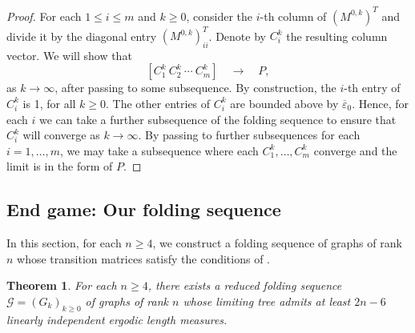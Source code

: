 \documentclass[11pt, letterpaper]{amsart}
\theoremstyle{plain}
\newtheorem{theorem}{Theorem}[section]
\theoremstyle{definition}
\newcommand{\calG}{\mathcal{G}}
\renewcommand{\epsilon}{\varepsilon}
\newcommand{\eps}{\epsilon}
\newcommand{\ov}[1]{\overline{#1}}
\begin{document}
\begin{proof}
    For each $1 \le i \le m$ and $k \ge 0$, consider the $i$-th column of
    $(M^{0,k})^T$ and divide it by the diagonal entry $(M^{0,k})^T_{ii}$. Denote
    by $C_i^k$ the resulting column vector. We will show that
    \[
        \left[ C_1^k\ C_2^k\ \cdots \ C_m^k \right] \quad \longrightarrow \quad P,
    \] 
    as $k \to \infty$, after passing to some subsequence.
    By construction, the $i$-th entry of $C_i^k$ is 1, for all $k \ge 0$. The other entries of $C_i^k$ are bounded above by $\ov{\eps}_0$. Hence, for each $i$ we can take a further subsequence of the folding sequence to ensure that $C_i^k$ will converge as $k\to \infty$. By passing to further subsequences for each $i=1,\ldots,m$, we may take a subsequence where each $C_1^k,\ldots,C_m^k$ converge and the limit is in the form of $P$. 
    \end{proof}

\subsection{End game: Our folding sequence}

\label{ssec:lowerboundFinale_folding}
In this section, for each $n \ge 4$, we construct a folding sequence of graphs of rank $n$ whose transition matrices satisfy the conditions of .

\begin{theorem} \label{thm:lowerboundFinale_folding}
For each $n \ge 4$, there exists a reduced folding sequence $\calG=(G_k)_{k \ge 0}$ of
graphs of rank $n$ whose limiting tree admits at least $2n-6$ linearly independent ergodic length measures.
\end{theorem}
\end{document}
